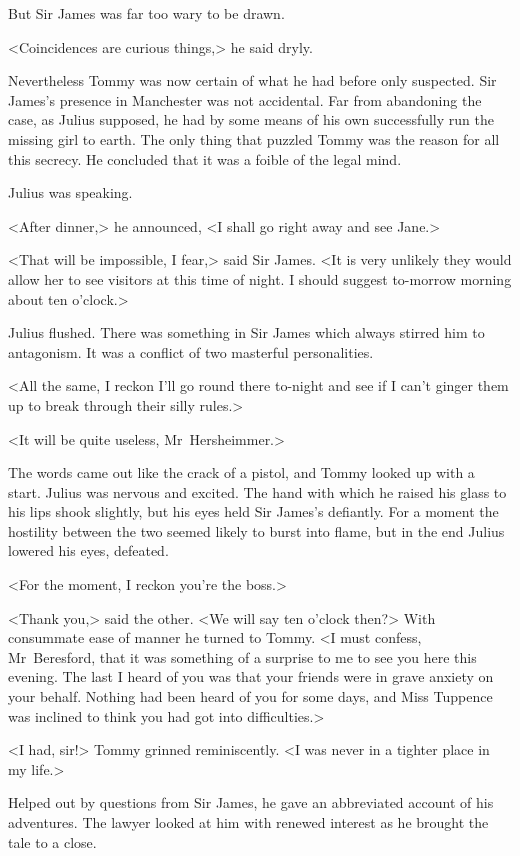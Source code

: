 But Sir James was far too wary to be drawn.

<Coincidences are curious things,> he said dryly.

Nevertheless Tommy was now certain of what he had before only suspected. Sir James's presence in Manchester was not accidental. Far from abandoning the case, as Julius supposed, he had by some means of his own successfully run the missing girl to earth. The only thing that puzzled Tommy was the reason for all this secrecy. He concluded that it was a foible of the legal mind.

Julius was speaking.

<After dinner,> he announced, <I shall go right away and see Jane.>

<That will be impossible, I fear,> said Sir James. <It is very unlikely they would allow her to see visitors at this time of night. I should suggest to-morrow morning about ten o'clock.>

Julius flushed. There was something in Sir James which always stirred him to antagonism. It was a conflict of two masterful personalities.

<All the same, I reckon I'll go round there to-night and see if I can't ginger them up to break through their silly rules.>

<It will be quite useless, Mr~Hersheimmer.>

The words came out like the crack of a pistol, and Tommy looked up with a start. Julius was nervous and excited. The hand with which he raised his glass to his lips shook slightly, but his eyes held Sir James's defiantly. For a moment the hostility between the two seemed likely to burst into flame, but in the end Julius lowered his eyes, defeated.

<For the moment, I reckon you're the boss.>

<Thank you,> said the other. <We will say ten o'clock then?> With consummate ease of manner he turned to Tommy. <I must confess, Mr~Beresford, that it was something of a surprise to me to see you here this evening. The last I heard of you was that your friends were in grave anxiety on your behalf. Nothing had been heard of you for some days, and Miss Tuppence was inclined to think you had got into difficulties.>

<I had, sir!> Tommy grinned reminiscently. <I was never in a tighter place in my life.>

Helped out by questions from Sir James, he gave an abbreviated account of his adventures. The lawyer looked at him with renewed interest as he brought the tale to a close.

